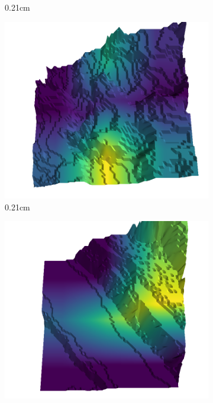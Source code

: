\documentclass[../document.tex]{subfiles}
\begin{document}
\begin{figure}[H]
\begin{subfigure}[b]{0.242\linewidth}
            \caption{0.21cm}
            \end{subfigure}
            \begin{subfigure}[b]{0.242\linewidth}
            \includegraphics[width=\linewidth]{../img/5/quarry/false_positive/22-patch-3d-majavi-colormap-10.png}
            \caption{0.21cm}
            \end{subfigure}
            \begin{subfigure}[b]{0.242\linewidth}
            \includegraphics[width=\linewidth]{../img/5/quarry/false_positive/24-patch-3d-majavi-colormap-15.png}

\end{subfigure}
\end{figure}
\end{document}
